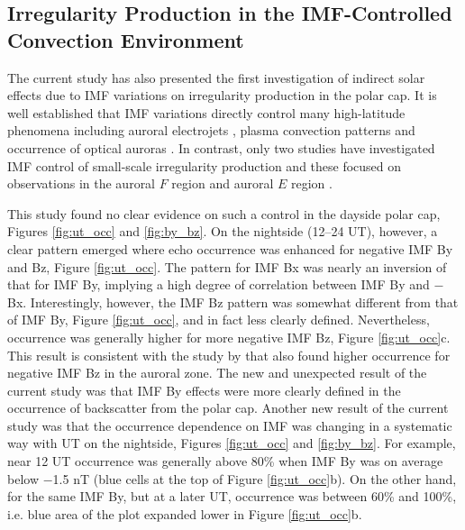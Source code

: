 \subsection{Irregularity Production in the IMF-Controlled Convection Environment}

The current study has also presented the first investigation of indirect solar effects due to IMF variations on irregularity production in the polar cap. It is well established that IMF variations directly control many high-latitude phenomena including auroral electrojets \citep[e.g.][]{McPherron1988}, plasma convection patterns \citep{Heelis1984,Ruohoniemi1996,Ridley1998,Pettigrew2010} and occurrence of optical auroras \citep{Ostgaard2004}. In contrast, only two studies have investigated IMF control of small-scale irregularity production and these focused on observations in the auroral \(F\) region \citep{Ballatore2001} and auroral \(E\) region \citep{Makarevich2012}.

This study found no clear evidence on such a control in the dayside polar cap, Figures \ref{fig:ut_occ} and \ref{fig:by_bz}. On the nightside (12--24 UT), however, a clear pattern emerged where echo occurrence was enhanced for negative IMF By and Bz, Figure \ref{fig:ut_occ}. The pattern for IMF Bx was nearly an inversion of that for IMF By, implying a high degree of correlation between IMF By and \(-\)Bx. Interestingly, however, the IMF Bz pattern was somewhat different from that of IMF By, Figure \ref{fig:ut_occ}, and in fact less clearly defined. Nevertheless, occurrence was generally higher for more negative IMF Bz, Figure \ref{fig:ut_occ}c. This result is consistent with the study by \citet{Ballatore2001} that also found higher occurrence for negative IMF Bz in the auroral zone. The new and unexpected result of the current study was that IMF By effects were more clearly defined in the occurrence of backscatter from the polar cap. Another new result of the current study was that the occurrence dependence on IMF was changing in a systematic way with UT on the nightside, Figures \ref{fig:ut_occ} and \ref{fig:by_bz}. For example, near 12 UT occurrence was generally above 80\% when IMF By was on average below \(-\)1.5 nT (blue cells at the top of Figure \ref{fig:ut_occ}b). On the other hand, for the same IMF By, but at a later UT, occurrence was between 60\% and 100\%, i.e. blue area of the plot expanded lower in Figure \ref{fig:ut_occ}b.

